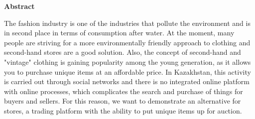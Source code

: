 \newpage
\pagestyle{plain}

{
\begin{center}
    \Large
    \textbf{Abstract}
\end{center}
The fashion industry is one of the industries that pollute the environment and is in second place in terms of consumption after water. At the moment, many people are striving for a more environmentally friendly approach to clothing and second-hand stores are a good solution. Also, the concept of second-hand and "vintage" clothing is gaining popularity among the young generation, as it allows you to purchase unique items at an affordable price. In Kazakhstan, this activity is carried out through social networks and there is no integrated online platform with online processes, which complicates the search and purchase of things for buyers and sellers. For this reason, we want to demonstrate an alternative for stores, a trading platform with the ability to put unique items up for auction.
}